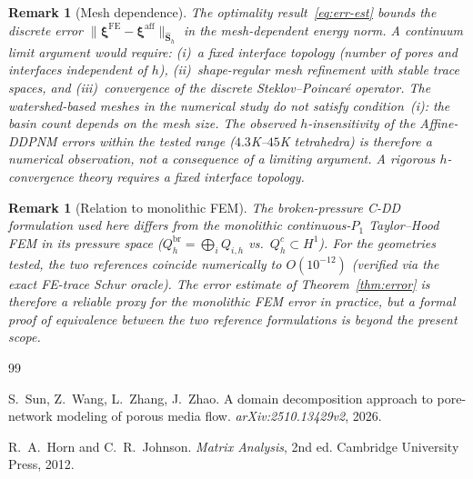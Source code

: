 \documentclass[11pt,a4paper]{article}
\newtheorem{remark}[lemma]{Remark}
\newcommand{\Schur}{\mathbf{S}}
\begin{document}
\begin{remark}[Mesh dependence]\label{rem:mesh}
  The optimality result~\eqref{eq:err-est} bounds the discrete error
  $\|\bm{\xi}^{\text{FE}} - \bm{\xi}^{\text{aff}}\|_{\widehat{\Schur}_h}$
  in the mesh-dependent energy norm.  A continuum limit argument would
  require: (i)~a fixed interface topology (number of pores and interfaces
  independent of $h$), (ii)~shape-regular mesh refinement with stable
  trace spaces, and (iii)~convergence of the discrete
  Steklov--Poincar\'e operator.  The watershed-based meshes in the
  numerical study do \emph{not} satisfy condition~(i): the basin count
  depends on the mesh size.  The observed $h$-insensitivity of the
  Affine-DDPNM errors within the tested range ($4.3$K--$45$K tetrahedra)
  is therefore a numerical observation, not a consequence of a limiting
  argument.  A rigorous $h$-convergence theory requires a fixed interface
  topology.
\end{remark}

\begin{remark}[Relation to monolithic FEM]
  The broken-pressure C-DD formulation used here differs from the
  monolithic continuous-$P_1$ Taylor--Hood FEM in its pressure space
  ($Q_h^{\text{br}} = \bigoplus_i Q_{i,h}$ vs.\ $Q_h^c \subset H^1$).
  For the geometries tested, the two references coincide numerically to
  $O(10^{-12})$ (verified via the exact FE-trace Schur oracle).  The
  error estimate of Theorem~\ref{thm:error} is therefore a reliable proxy
  for the monolithic FEM error in practice, but a formal proof of
  equivalence between the two reference formulations is beyond the
  present scope.
\end{remark}

\begin{thebibliography}{99}

S.~Sun, Z.~Wang, L.~Zhang, J.~Zhao.
\newblock A domain decomposition approach to pore-network modeling of porous
  media flow.
\newblock \textit{arXiv:2510.13429v2}, 2026.

R.~A.~Horn and C.~R.~Johnson.
\newblock \textit{Matrix Analysis}, 2nd ed.
\newblock Cambridge University Press, 2012.

\end{thebibliography}
\end{document}
